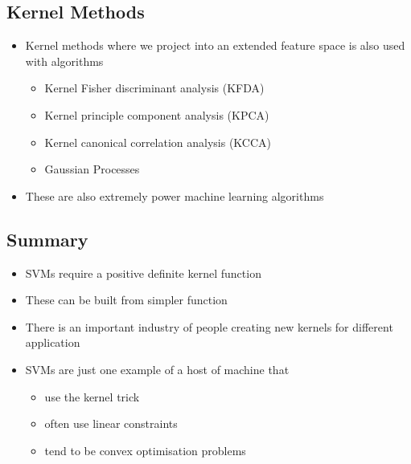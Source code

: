 
\begin{slide}
\section{Kernel Methods}

\begin{PauseHighLight}
  \begin{itemize}
  \item Kernel methods where we project into an extended feature space
    is also used with algorithms
    \begin{itemize}
    \item Kernel Fisher discriminant analysis (KFDA)
    \item Kernel principle component analysis (KPCA)
    \item Kernel canonical correlation analysis (KCCA)
    \item Gaussian Processes\pause
    \end{itemize}
  \item These are also extremely power machine learning algorithms\pause
  \end{itemize}
\end{PauseHighLight}

\end{slide}



\begin{slide}
\section[-1]{Summary}

\begin{PauseHighLight}
  \begin{itemize}
  \item SVMs require a positive definite kernel function\pause
  \item These can be built from simpler function\pause
  \item There is an important industry of people creating new kernels
    for different application\pause
  \item SVMs are just one example of a host of machine that
    \begin{itemize}
    \item use the kernel trick
    \item often use linear constraints
    \item tend to be convex optimisation problems\pause
    \end{itemize}
  \end{itemize}
\end{PauseHighLight}

\end{slide}





